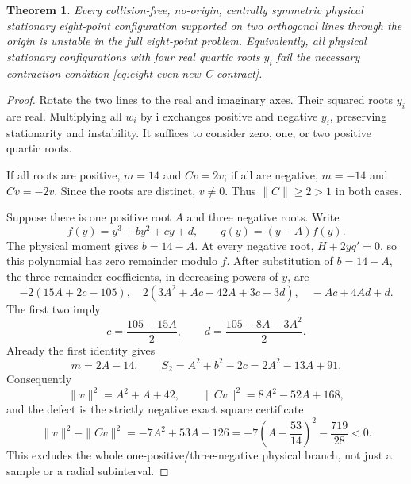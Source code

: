 \documentclass[11pt,a4paper]{article}
\newtheorem{theorem}{Theorem}[section]
\theoremstyle{remark}
\begin{document}
\begin{theorem}\label{thm:eight-even-new-axes-unstable}
Every collision-free, no-origin, centrally symmetric physical
stationary eight-point configuration supported on two orthogonal
lines through the origin is unstable in the full eight-point problem.
Equivalently, all physical stationary configurations with four real
quartic roots $y_i$ fail the necessary contraction condition
\eqref{eq:eight-even-new-C-contract}.
\end{theorem}
\begin{proof}
Rotate the two lines to the real and imaginary axes. Their squared
roots $y_i$ are real. Multiplying all $w_i$ by $\mathrm i$ exchanges
positive and negative $y_i$, preserving stationarity and instability.
It suffices to consider zero, one, or two positive quartic roots.

If all roots are positive, $m=14$ and $Cv=2v$; if all are negative,
$m=-14$ and $Cv=-2v$. Since the roots are distinct, $v\ne0$.
Thus $\|C\|\ge2>1$ in both cases.

Suppose there is one positive root $A$ and three negative roots.
Write
\[
 f(y)=y^3+by^2+cy+d,\qquad q(y)=(y-A)f(y).
\]
The physical moment gives $b=14-A$. At every negative root,
$H+2yq'=0$, so this polynomial has zero remainder modulo $f$.
After substitution of $b=14-A$, the three remainder coefficients,
in decreasing powers of $y$, are
\[
 -2(15A+2c-105),\quad
 2(3A^2+Ac-42A+3c-3d),\quad -Ac+4Ad+d.
\]
The first two imply
\[
 c=\frac{105-15A}{2},\qquad
 d=\frac{105-8A-3A^2}{2}.
\]
Already the first identity gives
\[
 m=2A-14,\qquad S_2=A^2+b^2-2c=2A^2-13A+91.
\]
Consequently
\[
 \|v\|^2=A^2+A+42,\qquad
 \|Cv\|^2=8A^2-52A+168,
\]
and the defect is the strictly negative exact square certificate
\begin{equation}\label{eq:eight-even-new-unbalanced-square}
 \|v\|^2-\|Cv\|^2
 =-7A^2+53A-126
 =-7\left(A-\frac{53}{14}\right)^2-\frac{719}{28}<0.
\end{equation}
This excludes the whole one-positive/three-negative physical branch,
not just a sample or a radial subinterval.


\end{proof}
\end{document}
